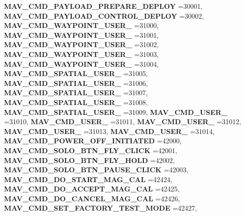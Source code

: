 \begin{DoxyCompactItemize}
\textbf{ M\+A\+V\+\_\+\+C\+M\+D\+\_\+\+P\+A\+Y\+L\+O\+A\+D\+\_\+\+P\+R\+E\+P\+A\+R\+E\+\_\+\+D\+E\+P\+L\+OY} =30001, 
\newline
\textbf{ M\+A\+V\+\_\+\+C\+M\+D\+\_\+\+P\+A\+Y\+L\+O\+A\+D\+\_\+\+C\+O\+N\+T\+R\+O\+L\+\_\+\+D\+E\+P\+L\+OY} =30002, 
\textbf{ M\+A\+V\+\_\+\+C\+M\+D\+\_\+\+W\+A\+Y\+P\+O\+I\+N\+T\+\_\+\+U\+S\+E\+R\+\_} =31000, 
\textbf{ M\+A\+V\+\_\+\+C\+M\+D\+\_\+\+W\+A\+Y\+P\+O\+I\+N\+T\+\_\+\+U\+S\+E\+R\+\_} =31001, 
\textbf{ M\+A\+V\+\_\+\+C\+M\+D\+\_\+\+W\+A\+Y\+P\+O\+I\+N\+T\+\_\+\+U\+S\+E\+R\+\_} =31002, 
\newline
\textbf{ M\+A\+V\+\_\+\+C\+M\+D\+\_\+\+W\+A\+Y\+P\+O\+I\+N\+T\+\_\+\+U\+S\+E\+R\+\_} =31003, 
\textbf{ M\+A\+V\+\_\+\+C\+M\+D\+\_\+\+W\+A\+Y\+P\+O\+I\+N\+T\+\_\+\+U\+S\+E\+R\+\_} =31004, 
\textbf{ M\+A\+V\+\_\+\+C\+M\+D\+\_\+\+S\+P\+A\+T\+I\+A\+L\+\_\+\+U\+S\+E\+R\+\_} =31005, 
\textbf{ M\+A\+V\+\_\+\+C\+M\+D\+\_\+\+S\+P\+A\+T\+I\+A\+L\+\_\+\+U\+S\+E\+R\+\_} =31006, 
\newline
\textbf{ M\+A\+V\+\_\+\+C\+M\+D\+\_\+\+S\+P\+A\+T\+I\+A\+L\+\_\+\+U\+S\+E\+R\+\_} =31007, 
\textbf{ M\+A\+V\+\_\+\+C\+M\+D\+\_\+\+S\+P\+A\+T\+I\+A\+L\+\_\+\+U\+S\+E\+R\+\_} =31008, 
\textbf{ M\+A\+V\+\_\+\+C\+M\+D\+\_\+\+S\+P\+A\+T\+I\+A\+L\+\_\+\+U\+S\+E\+R\+\_} =31009, 
\textbf{ M\+A\+V\+\_\+\+C\+M\+D\+\_\+\+U\+S\+E\+R\+\_} =31010, 
\newline
\textbf{ M\+A\+V\+\_\+\+C\+M\+D\+\_\+\+U\+S\+E\+R\+\_} =31011, 
\textbf{ M\+A\+V\+\_\+\+C\+M\+D\+\_\+\+U\+S\+E\+R\+\_} =31012, 
\textbf{ M\+A\+V\+\_\+\+C\+M\+D\+\_\+\+U\+S\+E\+R\+\_} =31013, 
\textbf{ M\+A\+V\+\_\+\+C\+M\+D\+\_\+\+U\+S\+E\+R\+\_} =31014, 
\newline
\textbf{ M\+A\+V\+\_\+\+C\+M\+D\+\_\+\+P\+O\+W\+E\+R\+\_\+\+O\+F\+F\+\_\+\+I\+N\+I\+T\+I\+A\+T\+ED} =42000, 
\textbf{ M\+A\+V\+\_\+\+C\+M\+D\+\_\+\+S\+O\+L\+O\+\_\+\+B\+T\+N\+\_\+\+F\+L\+Y\+\_\+\+C\+L\+I\+CK} =42001, 
\textbf{ M\+A\+V\+\_\+\+C\+M\+D\+\_\+\+S\+O\+L\+O\+\_\+\+B\+T\+N\+\_\+\+F\+L\+Y\+\_\+\+H\+O\+LD} =42002, 
\textbf{ M\+A\+V\+\_\+\+C\+M\+D\+\_\+\+S\+O\+L\+O\+\_\+\+B\+T\+N\+\_\+\+P\+A\+U\+S\+E\+\_\+\+C\+L\+I\+CK} =42003, 
\newline
\textbf{ M\+A\+V\+\_\+\+C\+M\+D\+\_\+\+D\+O\+\_\+\+S\+T\+A\+R\+T\+\_\+\+M\+A\+G\+\_\+\+C\+AL} =42424, 
\textbf{ M\+A\+V\+\_\+\+C\+M\+D\+\_\+\+D\+O\+\_\+\+A\+C\+C\+E\+P\+T\+\_\+\+M\+A\+G\+\_\+\+C\+AL} =42425, 
\textbf{ M\+A\+V\+\_\+\+C\+M\+D\+\_\+\+D\+O\+\_\+\+C\+A\+N\+C\+E\+L\+\_\+\+M\+A\+G\+\_\+\+C\+AL} =42426, 
\textbf{ M\+A\+V\+\_\+\+C\+M\+D\+\_\+\+S\+E\+T\+\_\+\+F\+A\+C\+T\+O\+R\+Y\+\_\+\+T\+E\+S\+T\+\_\+\+M\+O\+DE} =42427, 

\end{DoxyCompactItemize}

